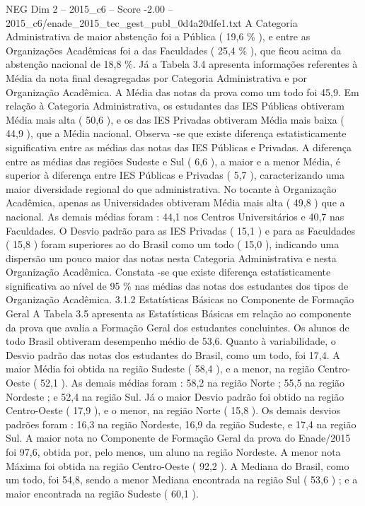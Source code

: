 \begin{textsample}{NEG Dim 2 – 2015\_c6 – Score -2.00 – 2015\_c6/enade\_2015\_tec\_gest\_publ\_0d4a20dfe1.txt}
A Categoria Administrativa de maior abstenção foi a Pública ( 19,6 \% ), e entre as Organizações Acadêmicas foi a das Faculdades ( 25,4 \% ), que ficou acima da abstenção nacional de 18,8 \%.
Já a Tabela 3.4 apresenta informações referentes à Média da nota final desagregadas por Categoria Administrativa e por Organização Acadêmica.
A Média das notas da prova como um todo foi 45,9.
Em relação à Categoria Administrativa, os estudantes das IES Públicas obtiveram Média mais alta ( 50,6 ), e os das IES Privadas obtiveram Média mais baixa ( 44,9 ), que a Média nacional.
Observa -se que existe diferença estatisticamente significativa entre as médias das notas das IES Públicas e Privadas.
A diferença entre as médias das regiões Sudeste e Sul ( 6,6 ), a maior e a menor Média, é superior à diferença entre IES Públicas e Privadas ( 5,7 ), caracterizando uma maior diversidade regional do que administrativa.
No tocante à Organização Acadêmica, apenas as Universidades obtiveram Média mais alta ( 49,8 ) que a nacional.
As demais médias foram : 44,1 nos Centros Universitários e 40,7 nas Faculdades.
O Desvio padrão para as IES Privadas ( 15,1 ) e para as Faculdades ( 15,8 ) foram superiores ao do Brasil como um todo ( 15,0 ), indicando uma dispersão um pouco maior das notas nesta Categoria Administrativa e nesta Organização Acadêmica.
Constata -se que existe diferença estatisticamente significativa ao nível de 95 \% nas médias das notas dos estudantes dos tipos de Organização Acadêmica. 3.1.2 Estatísticas Básicas no Componente de Formação Geral A Tabela 3.5 apresenta as Estatísticas Básicas em relação ao componente da prova que avalia a Formação Geral dos estudantes concluintes.
Os alunos de todo Brasil obtiveram desempenho médio de 53,6.
Quanto à variabilidade, o Desvio padrão das notas dos estudantes do Brasil, como um todo, foi 17,4.
A maior Média foi obtida na região Sudeste ( 58,4 ), e a menor, na região Centro-Oeste ( 52,1 ).
As demais médias foram : 58,2 na região Norte ; 55,5 na região Nordeste ; e 52,4 na região Sul.
Já o maior Desvio padrão foi obtido na região Centro-Oeste ( 17,9 ), e o menor, na região Norte ( 15,8 ).
Os demais desvios padrões foram : 16,3 na região Nordeste, 16,9 da região Sudeste, e 17,4 na região Sul.
A maior nota no Componente de Formação Geral da prova do Enade/2015 foi 97,6, obtida por, pelo menos, um aluno na região Nordeste.
A menor nota Máxima foi obtida na região Centro-Oeste ( 92,2 ).
A Mediana do Brasil, como um todo, foi 54,8, sendo a menor Mediana encontrada na região Sul ( 53,6 ) ; e a maior encontrada na região Sudeste ( 60,1 ).

\end{textsample}
